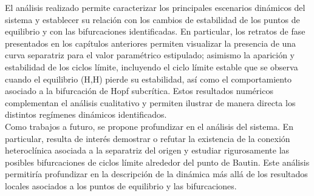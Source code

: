 El análisis realizado permite caracterizar los principales escenarios dinámicos del sistema y establecer su relación con los cambios de estabilidad de los puntos de equilibrio y con las bifurcaciones identificadas. En particular, los retratos de fase presentados en los capítulos anteriores permiten visualizar la presencia de una curva separatriz para el valor paramétrico estipulado; asimismo la aparición y estabilidad de los ciclos límite, incluyendo el ciclo límite estable que se observa cuando el equilibrio (H,H) pierde su estabilidad, así como el comportamiento asociado a la bifurcación de Hopf subcrítica. Estos resultados numéricos complementan el análisis cualitativo y permiten ilustrar de manera directa los distintos regímenes dinámicos identificados.\\

Como trabajos a futuro, se propone profundizar en el análisis del sistema. En particular, resulta de interés demostrar o refutar la existencia de la conexión heteroclínica asociada a la separatriz del origen y estudiar rigurosamente las posibles bifurcaciones de ciclos límite alrededor del punto de Bautin. Este análisis permitiría profundizar en la descripción de la dinámica más allá de los resultados locales asociados a los puntos de equilibrio y las bifurcaciones.